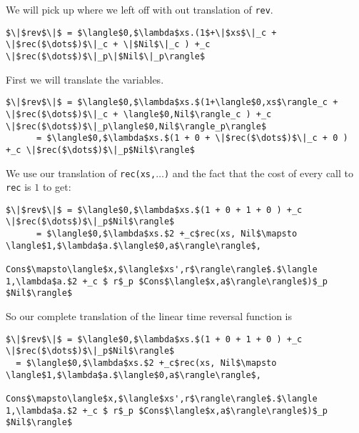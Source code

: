 \documentclass[12pt,letterpaper]{article}
\begin{document}
We will pick up where we left off with out translation of \texttt{rev}.
\begin{lstlisting}
$\|$rev$\|$ = $\langle$0,$\lambda$xs.(1$+\|$xs$\|_c + \|$rec($\dots$)$\|_c + \|$Nil$\|_c ) +_c \|$rec($\dots$)$\|_p\|$Nil$\|_p\rangle$
\end{lstlisting}
First we will translate the variables.
\begin{lstlisting}
$\|$rev$\|$ = $\langle$0,$\lambda$xs.$(1+\langle$0,xs$\rangle_c + \|$rec($\dots$)$\|_c + \langle$0,Nil$\rangle_c ) +_c \|$rec($\dots$)$\|_p\langle$0,Nil$\rangle_p\rangle$
      = $\langle$0,$\lambda$xs.$(1 + 0 + \|$rec($\dots$)$\|_c + 0 ) +_c \|$rec($\dots$)$\|_p$Nil$\rangle$
\end{lstlisting}
We use our translation of \texttt{rec(xs,$\dots$)} and the fact that the cost of every call to \texttt{rec} is $1$ to get:
\begin{lstlisting}
$\|$rev$\|$ = $\langle$0,$\lambda$xs.$(1 + 0 + 1 + 0 ) +_c \|$rec($\dots$)$\|_p$Nil$\rangle$
      = $\langle$0,$\lambda$xs.$2 +_c$rec(xs, Nil$\mapsto \langle$1,$\lambda$a.$\langle$0,a$\rangle\rangle$,
                      Cons$\mapsto\langle$x,$\langle$xs',r$\rangle\rangle$.$\langle 1,\lambda$a.$2 +_c $ r$_p $Cons$\langle$x,a$\rangle\rangle$)$_p $Nil$\rangle$
\end{lstlisting}

So our complete translation of the linear time reversal function is
\begin{framed}
\begin{small}
\begin{lstlisting}
$\|$rev$\|$ = $\langle$0,$\lambda$xs.$(1 + 0 + 1 + 0 ) +_c \|$rec($\dots$)$\|_p$Nil$\rangle$
  = $\langle$0,$\lambda$xs.$2 +_c$rec(xs, Nil$\mapsto \langle$1,$\lambda$a.$\langle$0,a$\rangle\rangle$,
                  Cons$\mapsto\langle$x,$\langle$xs',r$\rangle\rangle$.$\langle 1,\lambda$a.$2 +_c $ r$_p $Cons$\langle$x,a$\rangle\rangle$)$_p $Nil$\rangle$
\end{lstlisting}
\end{small}
\end{framed}
\end{document}
